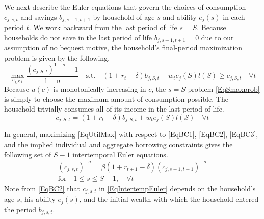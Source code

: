 \documentclass[letterpaper,12pt]{article}
\theoremstyle{definition}
\begin{document}
\begin{spacing}{1.5}
  We next describe the Euler equations that govern the choices of consumption $c_{j,s,t}$ and savings $b_{j,s+1,t+1}$ by household of age $s$ and ability $e_j(s)$ in each period $t$. We work backward from the last period of life $s = S$. Because households do not save in the last period of life $b_{j,s+1,t+1}=0$ due to our assumption of no bequest motive, the household's final-period maximization problem is given by the following.
  \begin{equation}\label{EqSmaxprob}
    \max_{c_{j,S,t}} \frac{\left(c_{j,S,t}\right)^{1-\sigma} - 1}{1 - \sigma} \quad \text{s.t.} \quad \left(1+r_t-\delta\right)b_{j,S,t} + w_t e_j(S)l(S) \geq c_{j,S,t} \quad \forall t
  \end{equation}
  Because $u(c)$ is monotonically increasing in $c$, the $s=S$ problem \eqref{EqSmaxprob} is simply to choose the maximum amount of consumption possible. The household trivially consumes all of its income in the last period of life.
  \begin{equation}\label{EqScons}
    c_{j,S,t} = \left(1+r_t-\delta\right)b_{j,S,t} + w_t e_j(S)l(S) \quad \forall t
  \end{equation}

  In general, maximizing \eqref{EqUtilMax} with respect to \eqref{EqBC1}, \eqref{EqBC2}, \eqref{EqBC3}, and the implied individual and aggregate borrowing constraints gives the following set of $S-1$ intertemporal Euler equations.
  \begin{equation}\label{EqIntertempEuler}
    \begin{split}
      \left(c_{j,s,t}\right)^{-\sigma} = \beta \left(1+r_{t+1}-\delta\right)\left(c_{j,s+1,t+1}\right)^{-\sigma} \\
      \text{for} \quad 1\leq s\leq S-1, \quad \forall t
    \end{split}
  \end{equation}
  Note from \eqref{EqBC2} that $c_{j,s,t}$ in \eqref{EqIntertempEuler} depends on the household's age $s$, his ability $e_j(s)$, and the initial wealth with which the household entered the period $b_{j,s,t}$.



\end{spacing}
\end{document}
